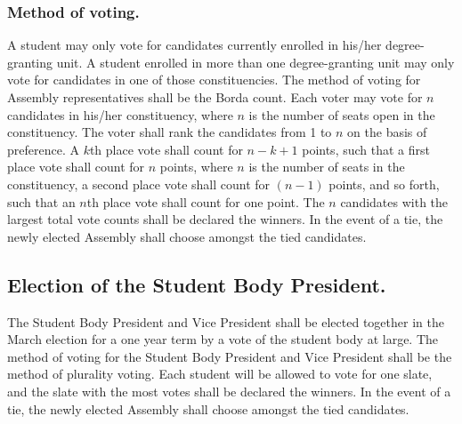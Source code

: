 \subsubsection{Method of voting.}  A student may only vote for candidates currently enrolled in his/her degree-granting unit.  A student enrolled in more than one degree-granting unit may only vote for candidates in one of those constituencies.  The method of voting for Assembly representatives shall be the Borda count.  Each voter may vote for $n$ candidates in his/her constituency, where $n$ is the number 
of seats open in the constituency. The voter shall rank the candidates from 
1 to $n$ on the basis of preference.  A $k$th place vote shall count for $n-k+1$ points, such that a first place vote shall count for $n$ points, where $n$ 
is the number of seats in the constituency, a second place vote shall count 
for $(n-1)$ points, and so forth, such that an $n$th place vote shall count for one point.  The $n$ candidates with the largest total vote counts shall be declared the winners.  In the event of a tie, the newly elected Assembly shall choose amongst the tied candidates.

\subsection{Election of the Student Body President.}
The Student Body President and Vice President shall be elected together in the March election for a one year term by a vote of the student body at large.  The method of voting for the Student Body President and Vice President shall be the method of plurality voting.  Each student will be allowed to vote for one slate, and the slate with the most votes shall be declared the winners.  In the event of a tie, the newly elected Assembly shall choose amongst the tied candidates.